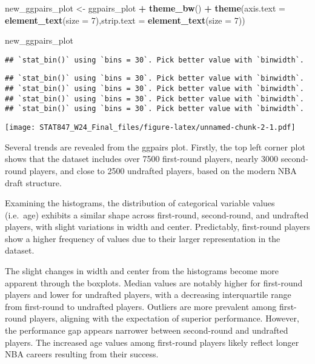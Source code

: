 \documentclass[
]{article}
\newenvironment{Shaded}{\begin{snugshade}}{\end{snugshade}}
\newcommand{\AttributeTok}[1]{\textcolor[rgb]{0.13,0.29,0.53}{#1}}
\newcommand{\DecValTok}[1]{\textcolor[rgb]{0.00,0.00,0.81}{#1}}
\newcommand{\FunctionTok}[1]{\textcolor[rgb]{0.13,0.29,0.53}{\textbf{#1}}}
\newcommand{\NormalTok}[1]{#1}
\newcommand{\OtherTok}[1]{\textcolor[rgb]{0.56,0.35,0.01}{#1}}
\newcommand{\SpecialCharTok}[1]{\textcolor[rgb]{0.81,0.36,0.00}{\textbf{#1}}}
\begin{document}
\begin{Shaded}
\begin{Highlighting}[]
\NormalTok{new\_ggpairs\_plot }\OtherTok{\textless{}{-}}\NormalTok{ ggpairs\_plot }\SpecialCharTok{+} \FunctionTok{theme\_bw}\NormalTok{() }\SpecialCharTok{+}
  \FunctionTok{theme}\NormalTok{(}\AttributeTok{axis.text =} \FunctionTok{element\_text}\NormalTok{(}\AttributeTok{size =} \DecValTok{7}\NormalTok{),}\AttributeTok{strip.text =} \FunctionTok{element\_text}\NormalTok{(}\AttributeTok{size =} \DecValTok{7}\NormalTok{))}

\NormalTok{new\_ggpairs\_plot}
\end{Highlighting}
\end{Shaded}

\begin{verbatim}
## `stat_bin()` using `bins = 30`. Pick better value with `binwidth`.
\end{verbatim}

\begin{verbatim}
## `stat_bin()` using `bins = 30`. Pick better value with `binwidth`.
## `stat_bin()` using `bins = 30`. Pick better value with `binwidth`.
## `stat_bin()` using `bins = 30`. Pick better value with `binwidth`.
## `stat_bin()` using `bins = 30`. Pick better value with `binwidth`.
\end{verbatim}

\texttt{[image: STAT847\_W24\_Final\_files/figure-latex/unnamed-chunk-2-1.pdf]}

Several trends are revealed from the ggpairs plot. Firstly, the top left
corner plot shows that the dataset includes over 7500 first-round
players, nearly 3000 second-round players, and close to 2500 undrafted
players, based on the modern NBA draft structure.

Examining the histograms, the distribution of categorical variable
values (i.e.~age) exhibits a similar shape across first-round,
second-round, and undrafted players, with slight variations in width and
center. Predictably, first-round players show a higher frequency of
values due to their larger representation in the dataset.

The slight changes in width and center from the histograms become more
apparent through the boxplots. Median values are notably higher for
first-round players and lower for undrafted players, with a decreasing
interquartile range from first-round to undrafted players. Outliers are
more prevalent among first-round players, aligning with the expectation
of superior performance. However, the performance gap appears narrower
between second-round and undrafted players. The increased age values
among first-round players likely reflect longer NBA careers resulting
from their success.
\end{document}
